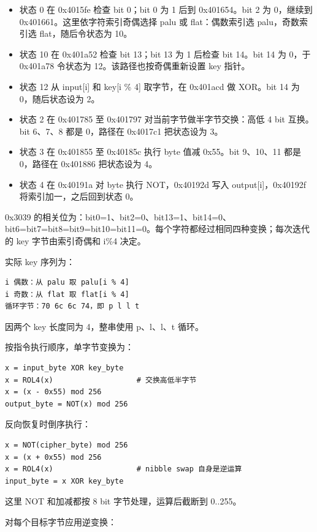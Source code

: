 \begin{itemize}
\tightlist
\item
  状态 0 在 0x4015fe 检查 bit 0；bit 0 为 1 后到 0x401654。bit 2 为 0，继续到 0x401661。这里依字符索引奇偶选择 palu 或 flat：偶数索引选 palu，奇数索引选 flat，随后令状态为 10。
\item
  状态 10 在 0x401a52 检查 bit 13；bit 13 为 1 后检查 bit 14。bit 14 为 0，于 0x401a78 令状态为 12。该路径也按奇偶重新设置 key 指针。
\item
  状态 12 从 input{[}i{]} 和 key{[}i \% 4{]} 取字节，在 0x401acd 做 XOR。bit 14 为 0，随后状态设为 2。
\item
  状态 2 在 0x401785 至 0x401797 对当前字节做半字节交换：高低 4 bit 互换。bit 6、7、8 都是 0，路径在 0x4017c1 把状态设为 3。
\item
  状态 3 在 0x401855 至 0x40185c 执行 byte 值减 0x55。bit 9、10、11 都是 0，路径在 0x401886 把状态设为 4。
\item
  状态 4 在 0x40191a 对 byte 执行 NOT，0x40192d 写入 output{[}i{]}，0x40192f 将索引加一，之后回到状态 0。
\end{itemize}

0x3039 的相关位为：bit0=1、bit2=0、bit13=1、bit14=0、bit6=bit7=bit8=bit9=bit10=bit11=0。每个字符都经过相同四种变换；每次迭代的 key 字节由索引奇偶和 i\%4 决定。

实际 key 序列为：

\begin{verbatim}
i 偶数：从 palu 取 palu[i % 4]
i 奇数：从 flat 取 flat[i % 4]
循环字节：70 6c 6c 74，即 p l l t
\end{verbatim}

因两个 key 长度同为 4，整串使用 p、l、l、t 循环。

按指令执行顺序，单字节变换为：

\begin{verbatim}
x = input_byte XOR key_byte
x = ROL4(x)                   # 交换高低半字节
x = (x - 0x55) mod 256
output_byte = NOT(x) mod 256
\end{verbatim}

反向恢复时倒序执行：

\begin{verbatim}
x = NOT(cipher_byte) mod 256
x = (x + 0x55) mod 256
x = ROL4(x)                   # nibble swap 自身是逆运算
input_byte = x XOR key_byte
\end{verbatim}

这里 NOT 和加减都按 8 bit 字节处理，运算后截断到 0..255。

对每个目标字节应用逆变换：

